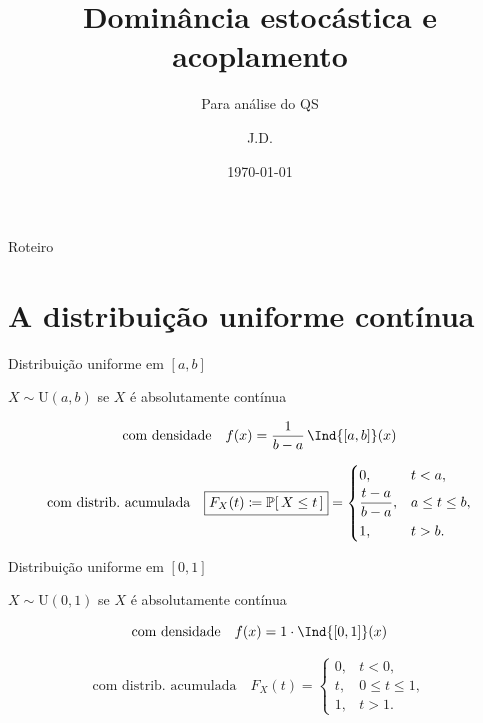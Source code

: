 \documentclass[aspectratio=169]{beamer}
\title{Dominância estocástica e acoplamento}
\subtitle{Para análise do QS}
\author{J.D.} \date{\today}
\begin{document}
\begin{frame}
  \titlepage
\end{frame}

\begin{frame}{Roteiro}
  \tableofcontents
\end{frame}

\section{A distribuição uniforme contínua}
\begin{frame}{Distribuição uniforme em $[a,b]$}

  \vfill
  
  \phantom{Sejam $a<b$. }$X\sim \mathrm{U}(a,b)$ se $X$ é absolutamente contínua
  
  \vfill
  
  \[
  \text{com densidade} \quad  f(x)=\frac{1}{b-a}\,\Ind{[a,b]}(x)
  \]
  
  \vfill
  
  \[
   \text{com distrib.~acumulada} \quad \boxed{F_X(t) \coloneqq \ProbE{X\leq t}} = \begin{cases}
      0, & t<a,\\[2pt]
      \dfrac{t-a}{b-a}, & a\leq t\leq b,\\[6pt]
      1, & t>b.
    \end{cases}
  \]
  \vfill
  
\end{frame}
\begin{frame}{Distribuição uniforme em $[0,1]$}
  \vfill
  
  \phantom{Sejam $a<b$. }$X\sim \mathrm{U}(0,1)$ se $X$ é absolutamente
  contínua
  \vfill
  
  \[
  \text{com densidade} \quad   f(x)= 1\cdot \Ind{[0,1]}(x)
  \]
 
  \vfill
  
  \[
   \text{com distrib.~acumulada} \quad  F_X(t)=\begin{cases}
      0, & t<0,\\[2pt]
      t, & 0\leq t\leq 1,\\[6pt]
      1, & t>1.
    \end{cases}
  \]
\vfill
  
  \end{frame}
\end{document}
